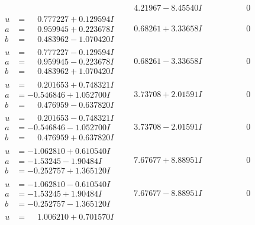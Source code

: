 \documentclass[1p]{elsarticle_modified}
\theoremstyle{definition}
\begin{document}
$$\begin{array}{c|c|c}
 & \phantom{-}4.21967 - 8.45540 I & \phantom{-0.000000 } 0 \\ \hline\begin{aligned}
u &= \phantom{-}0.777227 + 0.129594 I \\
a &= \phantom{-}0.959945 + 0.223678 I \\
b &= \phantom{-}0.483962 - 1.070420 I\end{aligned}
 & \phantom{-}0.68261 + 3.33658 I & \phantom{-0.000000 } 0 \\ \hline\begin{aligned}
u &= \phantom{-}0.777227 - 0.129594 I \\
a &= \phantom{-}0.959945 - 0.223678 I \\
b &= \phantom{-}0.483962 + 1.070420 I\end{aligned}
 & \phantom{-}0.68261 - 3.33658 I & \phantom{-0.000000 } 0 \\ \hline\begin{aligned}
u &= \phantom{-}0.201653 + 0.748321 I \\
a &= -0.546846 + 1.052700 I \\
b &= \phantom{-}0.476959 - 0.637820 I\end{aligned}
 & \phantom{-}3.73708 + 2.01591 I & \phantom{-0.000000 } 0 \\ \hline\begin{aligned}
u &= \phantom{-}0.201653 - 0.748321 I \\
a &= -0.546846 - 1.052700 I \\
b &= \phantom{-}0.476959 + 0.637820 I\end{aligned}
 & \phantom{-}3.73708 - 2.01591 I & \phantom{-0.000000 } 0 \\ \hline\begin{aligned}
u &= -1.062810 + 0.610540 I \\
a &= -1.53245 - 1.90484 I \\
b &= -0.252757 + 1.365120 I\end{aligned}
 & \phantom{-}7.67677 + 8.88951 I & \phantom{-0.000000 } 0 \\ \hline\begin{aligned}
u &= -1.062810 - 0.610540 I \\
a &= -1.53245 + 1.90484 I \\
b &= -0.252757 - 1.365120 I\end{aligned}
 & \phantom{-}7.67677 - 8.88951 I & \phantom{-0.000000 } 0 \\ \hline\begin{aligned}
u &= \phantom{-}1.006210 + 0.701570 I \\

\end{aligned}
\end{array}$$
\end{document}
